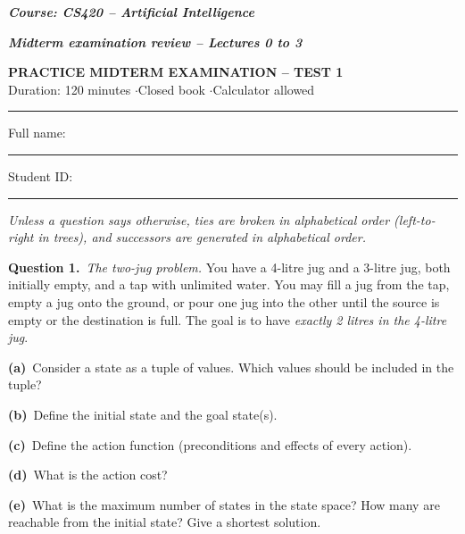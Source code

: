 \documentclass[11pt,a4paper]{article}
\newcommand{\question}[1]{\par\medskip\noindent\textbf{Question #1.}\ }
\newcommand{\subq}[1]{\par\smallskip\noindent\textbf{#1}\ }
\begin{document}
{\large\textbf{\textit{Course: CS420 -- Artificial Intelligence}}}\par
{\textbf{\textit{Midterm examination review -- Lectures 0 to 3}}}\par
\begin{center}{\Large\bfseries PRACTICE MIDTERM EXAMINATION -- TEST 1}\\[3pt]
{\small Duration: 120 minutes \quad$\cdot$\quad Closed book \quad$\cdot$\quad Calculator allowed}\end{center}
\noindent\rule{\linewidth}{0.6pt}

\noindent Full name: \rule{6.5cm}{0.3pt}\hfill Student ID: \rule{4cm}{0.3pt}\par\smallskip
{\small\textit{Unless a question says otherwise, ties are broken in alphabetical order (left-to-right in trees), and successors are generated in alphabetical order.}}\par
\question{1}\textit{The two-jug problem.} You have a 4-litre jug and a 3-litre jug, both initially empty, and a tap with unlimited water. You may fill a jug from the tap, empty a jug onto the ground, or pour one jug into the other until the source is empty or the destination is full. The goal is to have \emph{exactly 2 litres in the 4-litre jug}.
\subq{(a)}Consider a state as a tuple of values. Which values should be included in the tuple?
\begin{ansbox}[height=1.0cm]\end{ansbox}
\subq{(b)}Define the initial state and the goal state(s).
\begin{ansbox}[height=1.0cm]\end{ansbox}
\subq{(c)}Define the action function (preconditions and effects of every action).
\begin{ansbox}[height=2.0cm]\end{ansbox}
\subq{(d)}What is the action cost?
\begin{ansbox}[height=0.8cm]\end{ansbox}
\subq{(e)}What is the maximum number of states in the state space? How many are reachable from the initial state? Give a shortest solution.
\begin{ansbox}[height=2.0cm]\end{ansbox}
\end{document}
